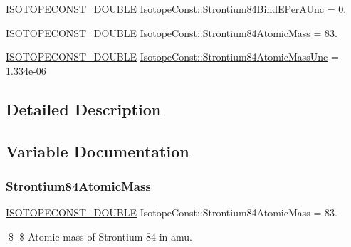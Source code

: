 \begin{DoxyCompactItemize}
\mbox{\hyperlink{group___isotope_const-_macros_ga8f45a7272ce02c0b4c65c44636ed719a}{I\+S\+O\+T\+O\+P\+E\+C\+O\+N\+S\+T\+\_\+\+D\+O\+U\+B\+LE}} \mbox{\hyperlink{group___isotope_const-_strontium-_sr84_ga3ac07022c4552241ca6c00d8a763c9c8}{Isotope\+Const\+::\+Strontium84\+Bind\+E\+Per\+A\+Unc}} = 0.
\item 
\mbox{\hyperlink{group___isotope_const-_macros_ga8f45a7272ce02c0b4c65c44636ed719a}{I\+S\+O\+T\+O\+P\+E\+C\+O\+N\+S\+T\+\_\+\+D\+O\+U\+B\+LE}} \mbox{\hyperlink{group___isotope_const-_strontium-_sr84_gad12bc9fdfdde2b6fd8774f7e2d2e4b11}{Isotope\+Const\+::\+Strontium84\+Atomic\+Mass}} = 83.
\item 
\mbox{\hyperlink{group___isotope_const-_macros_ga8f45a7272ce02c0b4c65c44636ed719a}{I\+S\+O\+T\+O\+P\+E\+C\+O\+N\+S\+T\+\_\+\+D\+O\+U\+B\+LE}} \mbox{\hyperlink{group___isotope_const-_strontium-_sr84_gad9262b36c4b4a09c60e3c0b3c0d6c550}{Isotope\+Const\+::\+Strontium84\+Atomic\+Mass\+Unc}} = 1.\+334e-\/06
\end{DoxyCompactItemize}


\subsection{Detailed Description}


\subsection{Variable Documentation}
\mbox{\label{group___isotope_const-_strontium-_sr84_gad12bc9fdfdde2b6fd8774f7e2d2e4b11}} 
\subsubsection{\texorpdfstring{Strontium84\+Atomic\+Mass}{Strontium84AtomicMass}}
{\footnotesize\ttfamily \mbox{\hyperlink{group___isotope_const-_macros_ga8f45a7272ce02c0b4c65c44636ed719a}{I\+S\+O\+T\+O\+P\+E\+C\+O\+N\+S\+T\+\_\+\+D\+O\+U\+B\+LE}} Isotope\+Const\+::\+Strontium84\+Atomic\+Mass = 83.}

\$ \$ Atomic mass of Strontium-\/84 in amu. \mbox{\label{group___isotope_const-_strontium-_sr84_gad9262b36c4b4a09c60e3c0b3c0d6c550}} 
